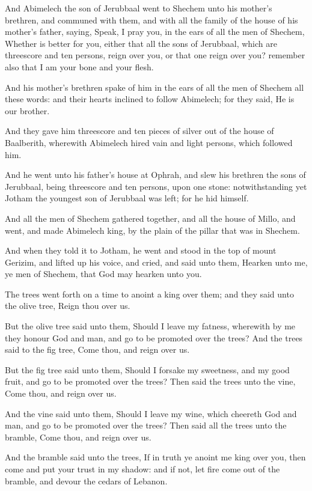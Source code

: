 \Chapter
\Verse And Abimelech the son of Jerubbaal went to Shechem unto his mother's brethren, and communed with them, and with all the family of the house of his mother's father, saying, \Verse Speak, I pray you, in the ears of all the men of Shechem, Whether is better for you, either that all the sons of Jerubbaal, which are threescore and ten persons, reign over you, or that one reign over you? remember also that I am your bone and your flesh.

\Verse And his mother's brethren spake of him in the ears of all the men of Shechem all these words: and their hearts inclined to follow Abimelech; for they said, He is our brother.

\Verse And they gave him threescore and ten pieces of silver out of the house of Baalberith, wherewith Abimelech hired vain and light persons, which followed him.

\Verse And he went unto his father's house at Ophrah, and slew his brethren the sons of Jerubbaal, being threescore and ten persons, upon one stone: notwithstanding yet Jotham the youngest son of Jerubbaal was left; for he hid himself.

\Verse And all the men of Shechem gathered together, and all the house of Millo, and went, and made Abimelech king, by the plain of the pillar that was in Shechem.

\Verse And when they told it to Jotham, he went and stood in the top of mount Gerizim, and lifted up his voice, and cried, and said unto them, Hearken unto me, ye men of Shechem, that God may hearken unto you.

\Verse The trees went forth on a time to anoint a king over them; and they said unto the olive tree, Reign thou over us.

\Verse But the olive tree said unto them, Should I leave my fatness, wherewith by me they honour God and man, and go to be promoted over the trees?  \Verse And the trees said to the fig tree, Come thou, and reign over us.

\Verse But the fig tree said unto them, Should I forsake my sweetness, and my good fruit, and go to be promoted over the trees?  \Verse Then said the trees unto the vine, Come thou, and reign over us.

\Verse And the vine said unto them, Should I leave my wine, which cheereth God and man, and go to be promoted over the trees?  \Verse Then said all the trees unto the bramble, Come thou, and reign over us.

\Verse And the bramble said unto the trees, If in truth ye anoint me king over you, then come and put your trust in my shadow: and if not, let fire come out of the bramble, and devour the cedars of Lebanon.

